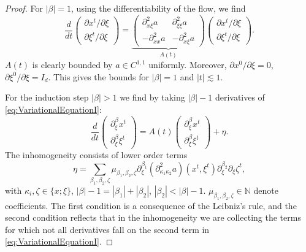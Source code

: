 \documentclass{amsart}
\theoremstyle{definition}
\newcommand{\N}{\mathbb{N}}
\begin{document}
\begin{proof}
For $|\beta| = 1$, using the differentiability of the flow, we find
\begin{equation}
\label{eq:VariationalEquationI}
\frac{d}{dt} \begin{pmatrix}
\partial x^t / \partial \xi \\ \partial \xi^t / \partial \xi
\end{pmatrix}
=
\underbrace{\begin{pmatrix}
\partial_{x \xi}^2 a  & \partial^2_{\xi \xi} a \\
- \partial_{xx}^2 a & - \partial_{x \xi}^2 a 
\end{pmatrix}}_{A(t)}
\begin{pmatrix}
\partial x^t / \partial \xi \\
\partial \xi^t / \partial \xi
\end{pmatrix}
.
\end{equation}
$A(t)$ is clearly bounded by $a \in C^{1,1}$ uniformly. Moreover, $\partial x^0 / \partial \xi = 0$, $\partial \xi^0 / \partial \xi = I_d$. This gives the bounds for $|\beta| = 1$ and $|t| \lesssim 1$.

\medskip

For the induction step $|\beta|>1$ we find by taking $|\beta|-1$ derivatives of \eqref{eq:VariationalEquationI}:
\begin{equation*}
\frac{d}{dt} \begin{pmatrix}
\partial_{\xi}^{\beta} x^t \\ \partial_{\xi}^{\beta} \xi^t
\end{pmatrix}
= A(t) 
\begin{pmatrix}
\partial_{\xi}^{\beta} x^t \\ \partial_{\xi}^{\beta} \xi^t
\end{pmatrix}
+ \eta.
\end{equation*}
The inhomogeneity consists of lower order terms
\begin{equation*}
\eta = \sum_{\beta_1,\beta_2,\zeta} \mu_{\beta_1,\beta_2,\zeta} \partial_{\xi}^{\beta_1} (\partial^2_{\kappa_1 \kappa_2} a)(x^t,\xi^t) \partial_{\xi}^{\beta_2} \partial_{\xi} \zeta^t,
\end{equation*}
with $\kappa_i, \zeta \in \{ x; \xi \}$, $|\beta|-1 = |\beta_1|+|\beta_2|$, $|\beta_2| < |\beta|-1$. $\mu_{\beta_1,\beta_2,\zeta} \in \N$ denote coefficients. The first condition is a consequence of the Leibniz's rule, and the second condition reflects that in the inhomogeneity we are collecting the terms for which not all derivatives fall on the second term in \eqref{eq:VariationalEquationI}.


\end{proof}
\end{document}
